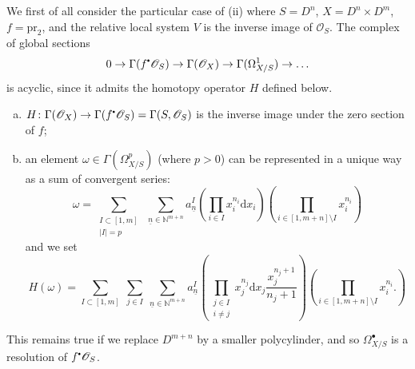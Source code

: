 \documentclass{report}
\theoremstyle{plain}
\theoremstyle{definition}
\newenvironment{env}[1]
    {\renewcommand\theinnercustomenv{#1}\innercustomenv}
    {\endinnercustomenv}
\newcommand{\sh}[1]{{\mathscr{#1}}}
\newcommand{\sbullet}{{\mathbin{\vcenter{\hbox{\scalebox{.5}{$\bullet$}}}}}}
\newcommand{\NN}{\mathbb{N}}
\newcommand{\dd}{\mathrm{d}}
\newcommand{\pr}{\mathrm{pr}}
\newcommand{\oldpage}[1]{\marginpar{\footnotesize$\Big\vert$ \textit{p.~#1}}}
\begin{document}
\begin{env}{2.23.2}
\label{I.2.23.2}
  We first of all consider the particular case of (ii) where $S=D^n$, $X=D^n\times D^m$, $f=\pr_2$, and the relative local system $V$ is the inverse image of $\sh{O}_S$.
  The complex of global sections
  \[
    0 \to \Gamma(f^\sbullet\sh{O}_S) \to \Gamma(\sh{O}_X) \to \Gamma(\Omega_{X/S}^1) \to \ldots
  \]
  is acyclic, since it admits the homotopy operator $H$ defined below.
\oldpage{16}
  \begin{enumerate}[a)]
    \item $H\colon \Gamma(\sh{O}_X) \to \Gamma(f^\sbullet\sh{O}_S) = \Gamma(S,\sh{O}_S)$ is the inverse image under the zero section of $f$;
    \item an element $\omega\in\Gamma(\Omega_{X/S}^p)$ (where $p>0$) can be represented in a unique way as a sum of convergent series:
      \[
        \omega = \sum_{\substack{I\subset[1,m]\\|I|=p}} \; \sum_{\underline{n}\in \NN^{m+n}} a_{\underline{n}}^I
        \left(
          \prod_{i\in I} x_i^{n_i}\dd x_i
        \right)
        \left(
          \prod_{i\in[1,m+n]\setminus I} x_i^{n_i}
        \right)
      \]
      and we set
      \[
        H(\omega) = \sum_{I\subset[1,m]} \; \sum_{j\in I} \; \sum_{\underline{n}\in\NN^{m+n}} a_{\underline{n}}^I
        \left(
          \prod_{\substack{j\in I\\i\neq j}} x_j^{n_j}\dd x_j \frac{x_j^{n_j+1}}{n_j+1}
        \right)
        \left(
          \prod_{i\in[1,m+n]\setminus I} x_i^{n_i}.
        \right)
      \]
  \end{enumerate}

  This remains true if we replace $D^{m+n}$ by a smaller polycylinder, and so $\Omega_{X/S}^\bullet$ is a resolution of $f^\sbullet\sh{O}_S$.
\end{env}
\end{document}
